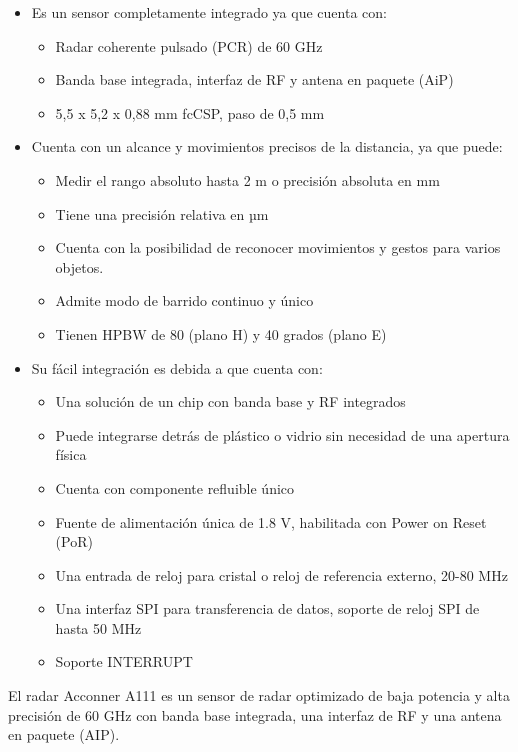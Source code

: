 \begin{itemize}
    \item Es un sensor completamente integrado ya que cuenta con:
    \begin{itemize}
        \item Radar coherente pulsado (PCR) de 60 GHz
        \item Banda base integrada, interfaz de RF y antena en paquete (AiP)
		\item 5,5 x 5,2 x 0,88 mm fcCSP, paso de 0,5 mm
    \end{itemize}
    \item Cuenta con un alcance y movimientos precisos de la distancia, ya que puede:
    \begin{itemize}
        \item Medir el rango absoluto hasta 2 m o precisión absoluta en mm
		\item Tiene una precisión relativa en µm
		\item Cuenta con la posibilidad de reconocer movimientos y gestos para varios objetos.
		\item Admite modo de barrido continuo y único
		\item Tienen HPBW de 80 (plano H) y 40 grados (plano E)
    \end{itemize}
    \item Su fácil integración es debida a que cuenta con:
    \begin{itemize}
        \item Una solución de un chip con banda base y RF integrados
		\item Puede integrarse detrás de plástico o vidrio sin necesidad de una apertura física
		\item Cuenta con componente refluible único
		\item Fuente de alimentación única de 1.8 V, habilitada con Power on Reset (PoR)
		\item Una entrada de reloj para cristal o reloj de referencia externo, 20-80 MHz
		\item Una interfaz SPI para transferencia de datos, soporte de reloj SPI de hasta 50 MHz
		\item Soporte INTERRUPT
    \end{itemize}
\end{itemize}

El radar Acconner A111 es un sensor de radar optimizado de baja potencia y alta precisión de 60 GHz con banda base integrada, una interfaz de RF y una antena en paquete (AIP).

